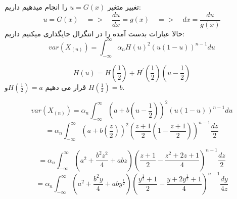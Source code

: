 \parte{}
تغییر متغیر $u = G(x)$ را انجام میدهیم داریم:\\
\[
    u = G(x)
    \quad
    =>
    \quad
    \frac{du}{dx} = g(x)
    \quad
    =>
    \quad
    dx = \frac{du}{g(x)}
\]
حالا عبارات بدست آمده را در انتگرال جایگذاری میکنیم داریم:\\
\[
    var(X_{(n)}) = \int_{-\infty}^{\infty}{
    \alpha_n {H(u)}^2(u(1-u))^{n-1} du
  }
\]

\parte{}
\[
    H(u) = H(\frac{1}{2})+{H^{\prime}(\frac{1}{2})}(u-\frac{1}{2}) 
\]
\parte{}
 قرار می دهیم $H(\frac{1}{2}) = a$و $H(\frac{1}{2}) = b$.

\[
    var(X_{(n)}) = \alpha_n  \int_{-\infty}^{\infty}{
    {(a+b(u-\frac{1}{2}))}^2(u(1-u))^{n-1} du
  }
\]
\[
    = \alpha_n  \int_{-\infty}^{\infty}{
    {(a+b(\frac{z}{2}))}^2(\frac{z+1}{2}(1-\frac{z+1}{2}))^{n-1} \frac{dz}{2}
  }
\]

\[
    = \alpha_n  \int_{-\infty}^{\infty}{
    (a^2+\frac{b^2z^2}{4}+abz)
    (\frac{z+1}{2} - \frac{z^2+2z+1}{4})^{n-1}
     \frac{dz}{2}
  }
\]
\[
    = \alpha_n  \int_{-\infty}^{\infty}{
    (a^2+\frac{b^2y}{4}+aby^\frac{1}{2})
    (\frac{y^\frac{1}{2}+1}{2} - \frac{y+2y^\frac{1}{2}+1}{4})^{n-1}
     \frac{dy}{4z}
  }
\]

